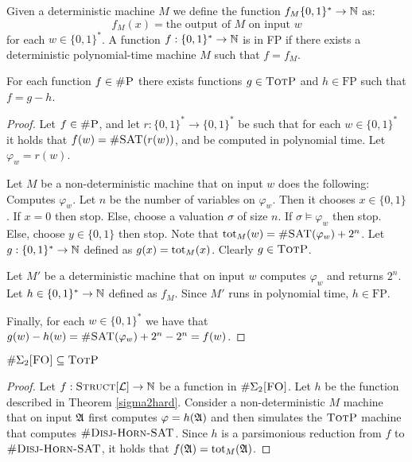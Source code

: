 Given a deterministic machine $M$ we define the function $f_M\{0,1\}^*\to\mathbb{N}$ as:
\[
	f_M(x) = \text{the output of $M$ on input $w$}
\]
for each $w\in\{0,1\}^*$. A function $f:\{0,1\}^*\to\mathbb{N}$ is in FP if there exists a deterministic polynomial-time machine $M$ such that $f = f_M$.
\begin{theo} \label{diff}
	For each function $f\in\textsc{\#P}$ there exists functions $g\in \textsc{TotP}$ and $h\in\text{FP}$ such that $f = g - h$.
\end{theo}
\begin{proof}
	Let $f\in\textsc{\#P}$, and let $r:\{0,1\}^*\to\{0,1\}^*$ be such that for each $w\in\{0,1\}^*$ it holds that $f(w) = \textsc{\#SAT}(r(w))$, and be computed in polynomial time. Let $\varphi_w = r(w)$.
	
	Let $M$ be a non-deterministic machine that on input $w$ does the following: Computes $\varphi_w$. Let $n$ be the number of variables on $\varphi_w$. Then it chooses $x\in\{0,1\}$. If $x = 0$ then stop. Else, choose a valuation $\sigma$ of size $n$. If $\sigma\models\varphi_w$ then stop. Else, choose $y\in\{0,1\}$ then stop. Note that $\text{tot}_M(w) = \textsc{\#SAT}(\varphi_w)+2^n$. Let $g:\{0,1\}^*\to\mathbb{N}$ defined as $g(x) = \text{tot}_M(x)$. Clearly $g\in\textsc{TotP}$.
	
	Let $M'$ be a deterministic machine that on input $w$ computes $\varphi_w$ and returns $2^n$. Let $h\in\{0,1\}^*\to\mathbb{N}$ defined as $f_M$. Since $M'$ runs in polynomial time, $h\in\text{FP}$.
	
	Finally, for each $w\in\{0,1\}^*$ we have that $g(w) - h(w) = \textsc{\#SAT}(\varphi_w) + 2^n - 2^n = f(w)$.
\end{proof}

\begin{theo}
	$\#\Sigma_{2}\textsc{[FO]} \subseteq \textsc{TotP}$
\end{theo}
\begin{proof}
	Let $f:\textsc{Struct}[{\cal L}]\to\mathbb{N}$ be a function in $\#\Sigma_{2}\textsc{[FO]}$. Let $h$ be the function described in Theorem \ref{sigma2hard}. Consider a non-deterministic $M$ machine that on input ${\frak A}$ first computes $\varphi = h({\frak A})$ and then simulates the $\textsc{TotP}$ machine that computes $\textsc{\#Disj-Horn-SAT}$. Since $h$ is a parsimonious reduction from $f$ to $\textsc{\#Disj-Horn-SAT}$, it holds that $f({\frak A}) = \text{tot}_M({\frak A})$.
\end{proof}


